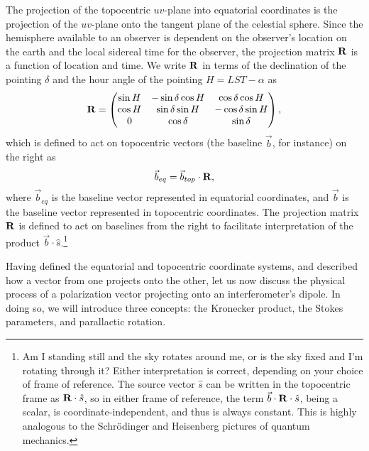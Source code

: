 The projection of the topocentric $uv$-plane into equatorial coordinates is the projection of the
$uv$-plane onto the tangent plane of the celestial sphere. Since the hemisphere
available to an observer is dependent on the observer's location on the earth and the local sidereal
time for the observer, the projection matrix $\mathbf{R}$ is a function of location and time. We write
$\mathbf{R}$ in terms of the declination of the pointing $\delta$ and the hour angle of the pointing $H =
LST-\alpha$ as  
\begin{equation}
  \mathbf{R} = \begin{pmatrix}
    \sin H & -\sin\delta\cos H &  \cos\delta\cos H \\
    \cos H &  \sin\delta\sin H & -\cos\delta\sin H \\
    0      &  \cos\delta       &  \sin\delta
  \end{pmatrix},
  \label{eq:def_top2eq}
\end{equation}
which is defined to act on topocentric vectors (the baseline $\vec{b}$, for instance) on the right as 
\begin{equation}
  \vec{b}_{eq} = \vec{b}_{top}\cdot\mathbf{R},
\end{equation}
where $\vec{b}_{eq}$ is the baseline vector represented in equatorial coordinates, and $\vec{b}$ is
the baseline vector represented in topocentric coordinates. The projection matrix $\mathbf{R}$ is defined to act
on baselines from the right to facilitate interpretation of the product
$\vec{b}\cdot\hat{s}$.\footnote{Am I standing still and the sky rotates around me, or is the sky
fixed and I'm rotating through it? Either interpretation is correct, depending on your choice of
frame of reference. The source vector $\hat{s}$ can be written in the topocentric frame as
$\mathbf{R}\cdot\hat{s}$, so in either frame of reference, the term $\vec{b}\cdot\mathbf{R}\cdot\hat{s}$, being a scalar, is
coordinate-independent, and thus is always constant. This is highly analogous to the Schr\"{o}dinger
and Heisenberg pictures of quantum mechanics.}

Having defined the equatorial and topocentric coordinate systems, and described how a vector from
one projects onto the other, let us now discuss the physical process of a polarization vector
projecting onto an interferometer's dipole. In doing so, we will introduce three concepts: the 
Kronecker product, the Stokes parameters, and parallactic rotation.

